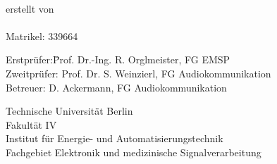 \begin{titlepage}
\begin{centering}
	\textbf{\Title}\\[2cm]

	
	\large
	erstellt von\\
	
	\Autor\\
	Matrikel: 339664\\[25mm]

	\begin{minipage}{\linewidth} 
		\begin{tabbing}
    	Erstprüfer:\quad \= Prof. Dr.-Ing. R. Orglmeister, FG EMSP\\
    	Zweitprüfer:             \> Prof. Dr. S. Weinzierl, FG Audiokommunikation\\
    	Betreuer:             \> D. Ackermann, FG Audiokommunikation \\
    			
  	\end{tabbing}
  \end{minipage}
	
	\vspace{10mm}
	
	\normalsize
	{Technische Universität Berlin}\\ {Fakultät IV}\\ {Institut für Energie- und Automatisierungstechnik}\\ {Fachgebiet Elektronik und medizinische Signalverarbeitung}\\
	\Datum\\
\end{centering}
\end{titlepage}
